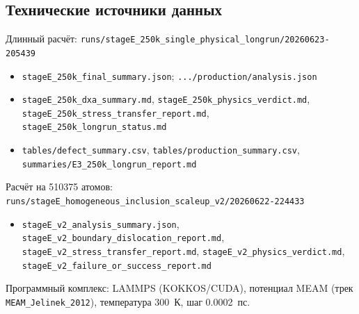 \documentclass[12pt,a4paper]{extarticle}
\newcommand{\code}[1]{\texttt{#1}}
\begin{document}
\subsection{Технические источники данных}
\footnotesize
\noindent Длинный расчёт: \code{runs/stageE\_250k\_single\_physical\_longrun/20260623-205439}
\begin{itemize}[leftmargin=1.4em,itemsep=1pt,topsep=1pt]
\item \code{stageE\_250k\_final\_summary.json}; \code{.../production/analysis.json}
\item \code{stageE\_250k\_dxa\_summary.md}, \code{stageE\_250k\_physics\_verdict.md}, \code{stageE\_250k\_stress\_transfer\_report.md}, \code{stageE\_250k\_longrun\_status.md}
\item \code{tables/defect\_summary.csv}, \code{tables/production\_summary.csv}, \code{summaries/E3\_250k\_longrun\_report.md}
\end{itemize}
\noindent Расчёт на 510375 атомов: \code{runs/stageE\_homogeneous\_inclusion\_scaleup\_v2/20260622-224433}
\begin{itemize}[leftmargin=1.4em,itemsep=1pt,topsep=1pt]
\item \code{stageE\_v2\_analysis\_summary.json}, \code{stageE\_v2\_boundary\_dislocation\_report.md}, \code{stageE\_v2\_stress\_transfer\_report.md}, \code{stageE\_v2\_physics\_verdict.md}, \code{stageE\_v2\_failure\_or\_success\_report.md}
\end{itemize}
\noindent Программный комплекс: LAMMPS (KOKKOS/CUDA), потенциал MEAM (трек \code{MEAM\_Jelinek\_2012}), температура 300~К, шаг 0.0002~пс.
\normalsize
\end{document}
